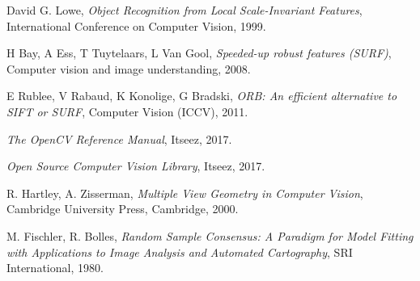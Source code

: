 \begin{thebibliography}{9}

  David G. Lowe,
  \textit{Object Recognition from Local Scale-Invariant Features},
  International Conference on Computer Vision,
  1999.

  H Bay, A Ess, T Tuytelaars, L Van Gool,
  \textit{Speeded-up robust features (SURF)},
  Computer vision and image understanding,
  2008.
  
  E Rublee, V Rabaud, K Konolige, G Bradski,
  \textit{ORB: An efficient alternative to SIFT or SURF},
  Computer Vision (ICCV),
  2011.
  
  \textit{The OpenCV Reference Manual},
  Itseez,
  2017.
  
  \textit{Open Source Computer Vision Library},
  Itseez,
  2017.
  
  R. Hartley, A. Zisserman,
  \textit{Multiple View Geometry in Computer Vision},
  Cambridge University Press,
  Cambridge,
  2000.
  
  M. Fischler, R. Bolles,
  \textit{Random Sample Consensus: A Paradigm for Model Fitting with Applications to Image Analysis and Automated Cartography},
  SRI International,
  1980.
  
\end{thebibliography}